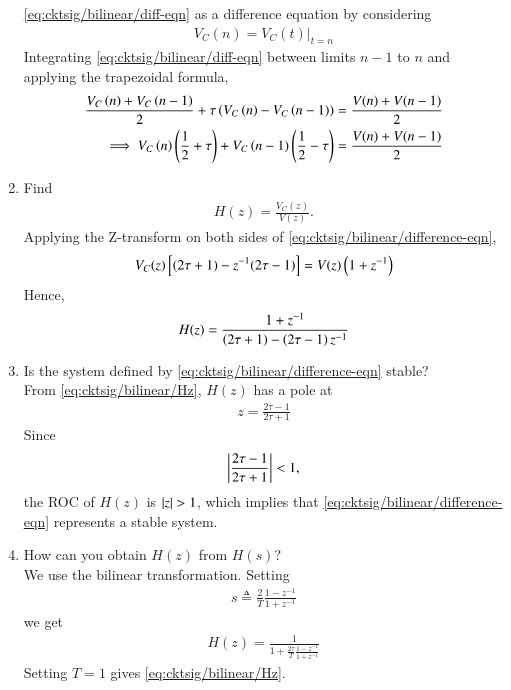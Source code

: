 \documentclass[journal,12pt,twocolumn]{IEEEtran}
\renewcommand\thesection{\arabic{section}}
\begin{document}
\begin{enumerate}[label=\arabic*.,ref=\thesection.\theenumi]
    \eqref{eq:cktsig/bilinear/diff-eqn}
as a
difference
equation by considering 
\begin{align}
	V_C(n) = V_C(t)\vert_{t=n}
\end{align}
\solution Integrating \eqref{eq:cktsig/bilinear/diff-eqn} between limits $n-1$ to $n$ 
and applying the trapezoidal formula,
\begin{align}
    \frac{V_C\brak{n} + V_C\brak{n-1}}{2} + \tau\brak{V_C\brak{n}-V_C\brak{n-1}} 
    = \frac{V(n)+V(n-1)}{2}
    \\
	\implies 
	V_C\brak{n} \brak{\frac{ 1}{2}+ \tau } + V_C\brak{n-1}\brak{\frac{ 1}{2}- \tau} 
    = \frac{V(n)+V(n-1)}{2}
    \label{eq:cktsig/bilinear/difference-eqn}
\end{align}
\item Find 
\begin{align}
H(z) =  \frac{V_C(z)}{V(z)}.
\end{align}
\solution Applying the Z-transform on both sides of \eqref{eq:cktsig/bilinear/difference-eqn},
\begin{align}
    V_C(z){}\left[(2\tau + 1) - z^{-1}(2\tau - 1)\right] = V(z)\left(1 + z^{-1}\right)
\end{align}
Hence,
\begin{align}
    H(z) = \frac{1+z^{-1}}{\brak{2\tau+1}-\brak{2\tau-1}z^{-1}}
    \label{eq:cktsig/bilinear/Hz}
\end{align}
\item Is the system defined by 
    \eqref{eq:cktsig/bilinear/difference-eqn} stable?
    \\
    \solution 
From     \eqref{eq:cktsig/bilinear/Hz}, 
$H(z)$ has a pole at 
\begin{align}
z =\frac{2\tau-1}{2\tau+1} 
\end{align}
Since 
\begin{align}
\left\vert\frac{2\tau-1}{2\tau+1}\right\vert < 1,
\end{align}
the ROC of $H(z)$ is $\left\vert z\right\vert > 1$, which implies that \eqref{eq:cktsig/bilinear/difference-eqn} represents a stable system.
\item How can you obtain $H(z)$ from $H(s)$?
\\
\solution We use the bilinear transformation. Setting
\begin{align}
    s \triangleq \frac{2}{T}\frac{1 - z^{-1}}{1 + z^{-1}}
\end{align}
we get
\begin{align}
    H(z) = \frac{1}{1 + \frac{2\tau}{T}\frac{1-z^{-1}}{1+z^{-1}}}
\end{align}
Setting $T = 1$ gives \eqref{eq:cktsig/bilinear/Hz}.


\end{enumerate}
\end{document}
